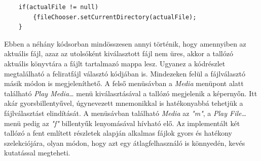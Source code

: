 \begin{verbatim}
	if(actualFile != null)
	    {fileChooser.setCurrentDirectory(actualFile);
	}
\end{verbatim}
        
Ebben a néhány kódsorban mindösszesen annyi történik, hogy amennyiben az aktuális fájl, azaz az utolsóként kiválasztott fájl nem üres, akkor a tallózó aktuális könyvtára a fájlt tartalmazó mappa lesz. Ugyanez a kódrészlet megtalálható a feliratfájl választó kódjában is. Mindezeken felül a fájlválasztó másik módon is megjeleníthető. A felső menüsávban a \textit{Media} menüpont alatt található \textit{Play Media…} menü kiválasztásával a tallózó megjelenik a képernyőn. Itt akár gyorsbillentyűvel, úgynevezett mnemonikkal is hatékonyabbá tehetjük a fájlválasztást elindítását. A menüsávban található \textit{Media} az \textit{"m"}, a \textit{Play File…} menü pedig az \textit{"f"} billentyűk lenyomásával hívható elő.
 Az implementált két tallózó a fent említett részletek alapján alkalmas fájlok gyors és hatékony szelekciójára, olyan módon, hogy azt egy átlagfelhasználó is könnyedén, kevés kutatással megteheti.
